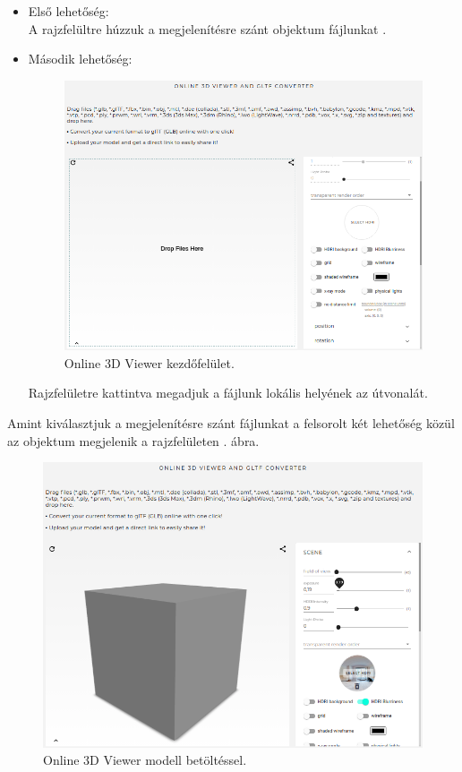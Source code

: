 \begin{itemize}
\item Első lehetőség: \\
A rajzfelültre húzzuk a megjelenítésre szánt objektum fájlunkat .
\item Második lehetőség:\\
\begin{figure}[h]
\centering
\includegraphics[width=\textwidth]{images/3D_creators.png}
\caption{Online 3D Viewer kezdőfelület.}
\label{fig:3d1}
\end{figure}
Rajzfelületre kattintva megadjuk a fájlunk lokális helyének az útvonalát.\\
\end{itemize}
\newpage
\bigskip
Amint kiválasztjuk a megjelenítésre szánt fájlunkat a felsorolt két lehetőség közül az objektum megjelenik a rajzfelületen . ábra.
\bigskip
\begin{figure}[h]
\centering
\includegraphics[width=\textwidth]{images/3D_creators_2.png}
\caption{Online 3D Viewer modell betöltéssel.}
\label{fig:3d2}
\end{figure}
\bigskip

